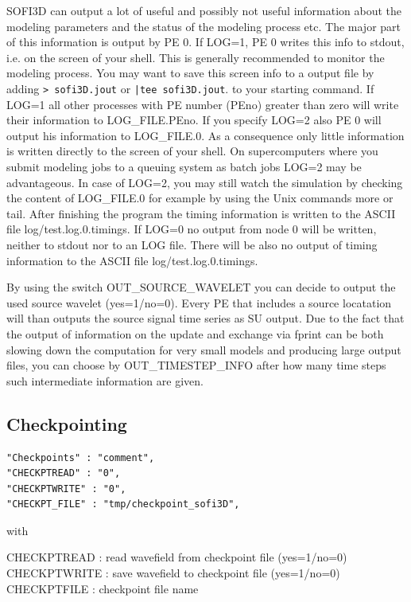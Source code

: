 \documentclass{hitec}
\begin{document}
SOFI3D can output a lot of useful and possibly not useful information about the modeling parameters and the status of the modeling process etc. The major part of this information is output by PE 0.
If LOG=1, PE 0 writes this info to stdout, i.e. on the screen of your shell. This is generally recommended  to monitor the modeling process. You may want to save this screen info to a output file by adding  \lstinline{> sofi3D.jout} or  \lstinline{|tee sofi3D.jout}. to your starting command. If LOG=1 all other processes with PE number (PEno) greater than zero will write their information to LOG\_FILE.PEno. If you specify LOG=2 also PE 0 will output his information to LOG\_FILE.0. As a consequence only little information is written directly to the screen of your shell. On supercomputers where you submit modeling jobs to a queuing system as batch jobs LOG=2 may be advantageous. In case of LOG=2, you may still watch the simulation by checking the content of LOG\_FILE.0 for example by using the Unix commands more or tail. After finishing the program the timing information is written to the ASCII file log/test.log.0.timings. If LOG=0 no output from node 0 will be written, neither to stdout nor to an LOG file. There will be also no output of timing information to the ASCII file log/test.log.0.timings. 

By using the switch OUT\_SOURCE\_WAVELET you can decide to output the used source wavelet (yes=1/no=0). Every PE that includes a source locatation will than outputs the source signal time series as SU output. Due to the fact that the output of information on the update and exchange via fprint can be both slowing down the computation for very small models and producing large output files, you can choose by OUT\_TIMESTEP\_INFO after how many time steps such intermediate information are given.

\subsection{Checkpointing}
\begin{verbatim}
"Checkpoints" : "comment",
"CHECKPTREAD" : "0",
"CHECKPTWRITE" : "0",
"CHECKPT_FILE" : "tmp/checkpoint_sofi3D",
\end{verbatim}

with 

CHECKPTREAD : read wavefield from checkpoint file (yes=1/no=0)\\
CHECKPTWRITE : save wavefield to checkpoint file (yes=1/no=0)\\
CHECKPTFILE : checkpoint file name\\
\end{document}
